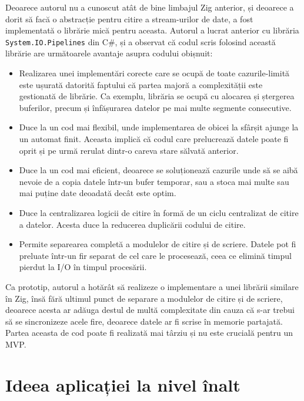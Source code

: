 \documentclass[a4paper,12pt]{report}
\begin{document}
Deoarece autorul nu a cunoscut atât de bine limbajul Zig anterior,
și deoarece a dorit să facă o abstracție pentru citire a stream-urilor de date,
a fost implementată o librărie mică pentru aceasta.
Autorul a lucrat anterior cu librăria \texttt{System.IO.Pipelines}\cite{system_io_pipelines} din C\#,
și a observat că codul scris folosind această librărie are următoarele avantaje 
asupra codului obișnuit:
\begin{itemize}
  \item 
    Realizarea unei implementări corecte care se ocupă de toate cazurile-limită 
    este ușurată datorită faptului că partea majoră a complexității este gestionată de librărie.
    Ca exemplu, librăria se ocupă cu alocarea și ștergerea buferilor,
    precum și înfășurarea datelor pe mai multe segmente consecutive.

  \item 
    Duce la un cod mai flexibil, unde implementarea de obicei la sfârșit ajunge 
    la un automat finit.
    Aceasta implică că codul care prelucrează datele poate
    fi oprit și pe urmă rerulat dintr-o careva stare sălvată anterior.

  \item
    Duce la un cod mai eficient, deoarece se soluționează cazurile unde să se aibă nevoie de
    a copia datele într-un bufer temporar, sau a stoca mai multe sau mai puține date deoadată
    decât este optim.

  \item
    Duce la centralizarea logicii de citire în formă de un ciclu centralizat de citire a datelor.
    Acesta duce la reducerea duplicării codului de citire.

  \item
    Permite separearea completă a modulelor de citire și de scriere.
    Datele pot fi preluate într-un fir separat de cel care le procesează,
    ceea ce elimină timpul pierdut la \ac{I/O} în timpul procesării.
\end{itemize}
    
Ca prototip, autorul a hotărât să realizeze o implementare a unei librării similare în Zig,
însă fără ultimul punct de separare a modulelor de citire și de scriere,
deoarece acesta ar adăuga destul de multă complexitate din cauza că s-ar trebui
să se sincronizeze acele fire, deoarece datele ar fi scrise în memorie partajată.
Partea aceasta de cod poate fi realizată mai târziu și nu este crucială pentru un \ac{MVP}.


\section{Ideea aplicației la nivel înalt}
\end{document}
